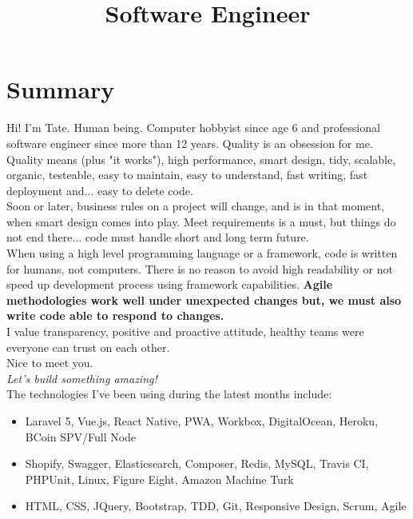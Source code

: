 \documentclass[11pt,a4paper,sans]{moderncv}        %
\title{Software Engineer}                               %
\begin{document}
\makecvtitle

\section{Summary}

Hi! I’m Tate. Human being. Computer hobbyist since age 6 and professional software engineer since more than 12 years.
Quality is an obsession for me. Quality means (plus "it works"), high performance, smart design, tidy, scalable, organic, testeable, easy to maintain, easy to understand, fast writing, fast deployment and... easy to delete code.\\


Soon or later, business rules on a project will change, and is in that moment, when smart design comes into play.
Meet requirements is a must, but things do not end there... code must handle short and long term future.\\

When using a high level programming language or a framework, code is written for humans, not computers. There is no reason to avoid high readability or not speed up development process using framework capabilities.
\textbf{Agile methodologies work well under unexpected changes but, we must also write code able to respond to changes.}\\

I value transparency, positive and proactive attitude, healthy teams were everyone can trust on each other.\\

Nice to meet you.\\
\textit{Let's build something amazing!}\\

\medskip The technologies I've been using during the latest months include:
\begin{itemize}
  \item Laravel 5, Vue.js, React Native, PWA, Workbox, DigitalOcean, Heroku, BCoin SPV/Full Node
  \item Shopify, Swagger, Elasticsearch, Composer, Redis, MySQL, Travis CI, PHPUnit, Linux, Figure Eight, Amazon Machine Turk
  \item HTML, CSS, JQuery, Bootstrap, TDD, Git, Responsive Design, Scrum, Agile
\end{itemize}
\end{document}
